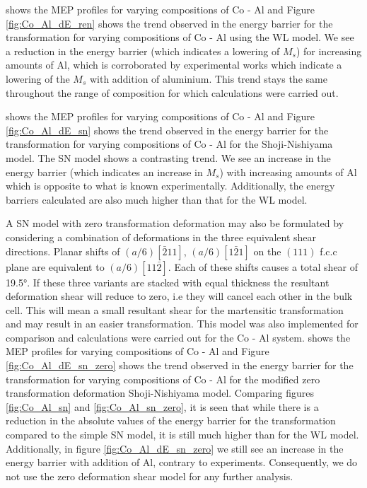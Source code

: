 \documentclass[preprint]{elsarticle}
\begin{document}
  shows the MEP profiles for varying compositions of Co - Al and Figure \ref{fig:Co_Al_dE_ren} shows the trend observed in the energy barrier for the transformation for varying compositions of Co - Al using the WL model. 
 We see a reduction in the energy barrier (which indicates a lowering of $M_s$) for increasing amounts of Al, which is corroborated by experimental works\cite{omori2003} which indicate a lowering of the $M_s$ with addition of aluminium.  This trend stays the same throughout the range of composition for which calculations were carried out.
 
  shows the MEP profiles for varying compositions of Co - Al  and Figure \ref{fig:Co_Al_dE_sn} shows the trend observed in the energy barrier for the transformation for varying compositions of Co - Al  for the Shoji-Nishiyama  model.
 The SN model shows a contrasting trend. We see an increase  in the energy barrier (which indicates an increase in  $M_s$) with increasing amounts of Al which is opposite to what is known experimentally. Additionally, the energy barriers calculated are also much higher than that for the WL model.

 A SN model with zero transformation deformation may also be formulated by considering a combination of deformations in the three equivalent shear directions\cite{nishiyama1978}. Planar shifts of $(a/6)[\bar2 1 1]$, $(a/6)[1 \bar2 1]$ on the $ (1 1 1)$ f.c.c plane are equivalent to $(a/6)[1 1\bar2]$. Each of these shifts causes a total shear of \ang{19.5}. If these three variants are stacked with equal thickness the resultant deformation shear will reduce to zero, i.e they will cancel each other in the bulk cell. This will mean a small resultant shear for the martensitic transformation and may result in an easier transformation. This model was also implemented for comparison and calculations were carried out for the Co - Al system.  
  shows the MEP profiles for varying compositions of Co - Al  and Figure \ref{fig:Co_Al_dE_sn_zero} shows the trend observed in the energy barrier for the transformation for varying compositions of Co - Al  for the modified zero transformation deformation Shoji-Nishiyama  model. Comparing figures \ref{fig:Co_Al_sn} and \ref{fig:Co_Al_sn_zero}, it is seen that while there is a reduction in the absolute values of the energy barrier for the transformation compared to the simple SN model, it is still much higher than for the WL model. Additionally, in figure \ref{fig:Co_Al_dE_sn_zero} we still see an increase in the energy barrier with addition of Al, contrary to experiments. Consequently, we do not use the zero deformation shear model for any further analysis.
\end{document}
